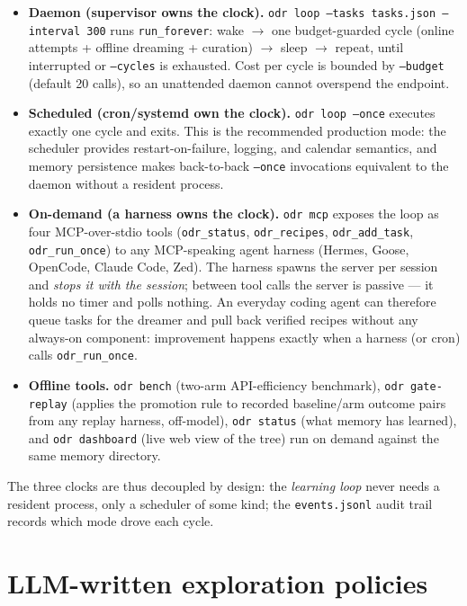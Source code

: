 \documentclass[11pt,a4paper]{article}
\newcommand{\hdr}[1]{\textbf{#1}}
\begin{document}
\begin{itemize}
  \item \hdr{Daemon (supervisor owns the clock).}
  \texttt{odr loop --tasks tasks.json --interval 300} runs
  \texttt{run\_forever}: wake $\rightarrow$ one budget-guarded cycle
  (online attempts + offline dreaming + curation) $\rightarrow$ sleep
  $\rightarrow$ repeat, until interrupted or \texttt{--cycles} is exhausted.
  Cost per cycle is bounded by \texttt{--budget} (default 20 calls), so an
  unattended daemon cannot overspend the endpoint.
  \item \hdr{Scheduled (cron/systemd own the clock).}
  \texttt{odr loop --once} executes exactly one cycle and exits. This is the
  recommended production mode: the scheduler provides restart-on-failure,
  logging, and calendar semantics, and memory persistence makes back-to-back
  \texttt{--once} invocations equivalent to the daemon without a resident
  process.
  \item \hdr{On-demand (a harness owns the clock).}
  \texttt{odr mcp} exposes the loop as four MCP-over-stdio tools
  (\texttt{odr\_status}, \texttt{odr\_recipes},
  \texttt{odr\_add\_task}, \texttt{odr\_run\_once}) to any MCP-speaking agent
  harness (Hermes, Goose, OpenCode, Claude Code, Zed). The harness spawns the
  server per session and \emph{stops it with the session}; between tool
  calls the server is passive --- it holds no timer and polls nothing. An
  everyday coding agent can therefore queue tasks for the dreamer and pull
  back verified recipes without any always-on component: improvement happens
  exactly when a harness (or cron) calls \texttt{odr\_run\_once}.
  \item \hdr{Offline tools.} \texttt{odr bench} (two-arm API-efficiency
  benchmark), \texttt{odr gate-replay} (applies the promotion rule to
  recorded baseline/arm outcome pairs from any replay harness, off-model),
  \texttt{odr status} (what memory has learned), and
  \texttt{odr dashboard} (live web view of the tree) run on demand against
  the same memory directory.
\end{itemize}

The three clocks are thus decoupled by design: the \emph{learning loop}
never needs a resident process, only a scheduler of some kind; the
\texttt{events.jsonl} audit trail records which mode drove each cycle.

\section{LLM-written exploration policies}
\label{sec:policy}
\end{document}
